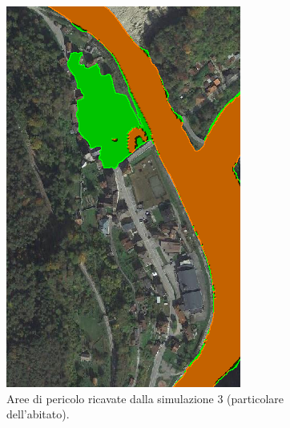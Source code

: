\begin{figure}[htb] \centering
    \includegraphics[scale=0.5]{immagini/part_aree_pericolo_3.png}
    \caption{Aree di pericolo ricavate dalla simulazione 3 (particolare dell'abitato).}
    \label{figure:part_aree_pericolo_3}
\end{figure}